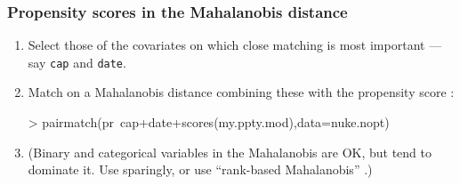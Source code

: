 \begin{frame}[fragile]
  \frametitle{Propensity scores in the Mahalanobis distance}

  \begin{enumerate}
 \item Select those of the covariates on which close matching is most
    important --- say \texttt{cap} and \texttt{date}.  
  \item Match on a Mahalanobis distance combining these with the
    propensity score \citep{rosenbaum:rubi:1985a,rubin:thom:2000}: %
\begin{Schunk}
\begin{Sinput}
> pairmatch(pr~cap+date+scores(my.ppty.mod),data=nuke.nopt)
\end{Sinput}
\end{Schunk}
\item 
  (Binary and categorical variables in the Mahalanobis are OK, but tend to dominate it.  Use sparingly, or use ``rank-based Mahalanobis'' \citep{rosenbaum2010design}.)
  \end{enumerate}

\end{frame}
